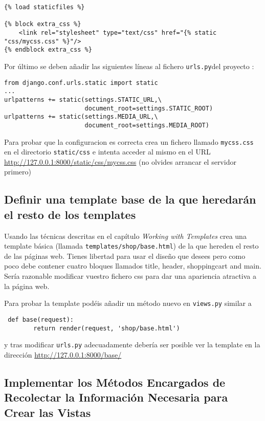 \documentclass[12pt]{article} %
\newcommand{\urls}{\texttt{urls.py}}%
\begin{document}
\begin{lstlisting}
{% load staticfiles %}

{% block extra_css %}
    <link rel="stylesheet" type="text/css" href="{% static "css/mycss.css" %}"/>
{% endblock extra_css %}
\end{lstlisting}

Por último se deben añadir las siguientes líneas al fichero \urls del proyecto :

\begin{lstlisting}[label={urls}]
from django.conf.urls.static import static
...
urlpatterns += static(settings.STATIC_URL,\
                      document_root=settings.STATIC_ROOT)
urlpatterns += static(settings.MEDIA_URL,\
                      document_root=settings.MEDIA_ROOT)
\end{lstlisting}

Para probar que la configuracion es correcta crea un fichero llamado \texttt{mycss.css}
en el directorio \texttt{static/css} e intenta acceder al mismo en el URL
\url{http://127.0.0.1:8000/static/css/mycss.css} (no olvides arrancar el servidor primero)

\subsection{Definir una template base de la que heredarán el resto de los templates}
   
   Usando las técnicas descritas en el capítulo \textit{Working with Templates} crea una 
template básica (llamada \texttt{templates/shop/base.html}) de la que hereden el resto de las páginas web. Tienes libertad para usar el diseño que desees pero como poco debe contener cuatro bloques llamados title, header, shoppingcart and main. Sería razonable modificar vuestro fichero css para dar una apariencia atractiva a la página web.

Para probar la template podéis añadir un método nuevo en \texttt{views.py} similar a
\begin{verbatim}
 def base(request):
        return render(request, 'shop/base.html')
\end{verbatim}
y tras modificar \texttt{urls.py} adecuadamente debería ser posible ver la template en la dirección \url{http://127.0.0.1:8000/base/}

\subsection{Implementar los Métodos Encargados de Recolectar la Información Necesaria para Crear las Vistas}   
\end{document}
